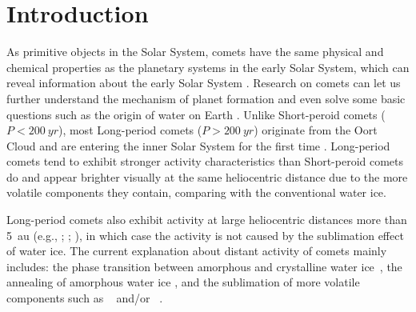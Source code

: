 \section{Introduction}

As primitive objects in the Solar System, comets have the same physical and chemical properties as the planetary systems in the early Solar System, which can reveal information about the early Solar System \citep{mazzotta_epifani_distant_2009, solontoi_ensemble_2012}. Research on comets can let us further understand the mechanism of planet formation and even solve some basic questions such as the origin of water on Earth \citep{alexander_water_2018}. Unlike Short-peroid comets ($P<\qty{200}{yr}$), most Long-period comets ($P>\qty{200}{yr}$) originate from the Oort Cloud and are entering the inner Solar System for the first time \citep{jewittCOLORSYSTEMATICSCOMETS2015}. Long-period comets tend to exhibit stronger activity characteristics than Short-peroid comets do and appear brighter visually at the same heliocentric distance due to the more volatile components they contain, comparing with the conventional water ice. 

Long-period comets also exhibit activity at large heliocentric distances more than {\qty{5}{\astronomicalunit}} (e.g., \citealt{mazzotta_epifani_distant_2009, mazzotta_epifani_activity_2010}; \citealt{meech_activity_2009}; \citealt{ivanova_quasi-simultaneous_2023}), in which case the activity is not caused by the sublimation effect of water ice. The current explanation about distant activity of comets mainly includes: the phase transition between amorphous and crystalline water ice~\citep{prialnik_crystallization_1992, capria_c1995_2002}, the annealing of amorphous water ice \citep{meech_activity_2009}, and the sublimation of more volatile components such as ~\citep{ootsubo_akari_2012} and/or ~\citep{jewitt_distant_2019}. 

